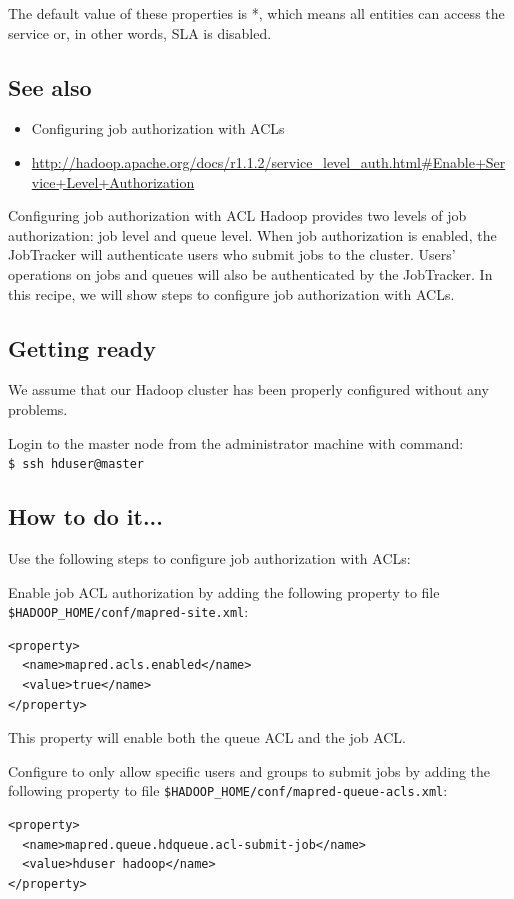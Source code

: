 The default value of these properties is *, which means all entities can access the service or, in other words, SLA is disabled.
\subsection*{See also}
\begin{itemize}
  \item Configuring job authorization with ACLs
  \item \url{http://hadoop.apache.org/docs/r1.1.2/service_level_auth.html#Enable+Service+Level+Authorization}
\end{itemize}

Configuring job authorization with ACL
Hadoop provides two levels of job authorization: job level and queue level. When job authorization is enabled, the JobTracker will authenticate users who submit jobs to the cluster. Users' operations on jobs and queues will also be authenticated by the JobTracker. In this recipe, we will show steps to configure job authorization with ACLs.
\subsection*{Getting ready}
We assume that our Hadoop cluster has been properly configured without any problems.

Login to the master node from the administrator machine with command: \\
\verb|$ ssh hduser@master|
\subsection*{How to do it...}
Use the following steps to configure job authorization with ACLs:

Enable job ACL authorization by adding the following property to file \verb|$HADOOP_HOME/conf/mapred-site.xml|:
\lstset{style=bashstyle}
\begin{lstlisting}
<property>
  <name>mapred.acls.enabled</name>
  <value>true</name>
</property>
\end{lstlisting}
This property will enable both the queue ACL and the job ACL.

Configure to only allow specific users and groups to submit jobs by adding the following property to file \verb|$HADOOP_HOME/conf/mapred-queue-acls.xml|:
\lstset{style=bashstyle}
\begin{lstlisting}
<property>
  <name>mapred.queue.hdqueue.acl-submit-job</name>
  <value>hduser hadoop</name>
</property>
\end{lstlisting}

